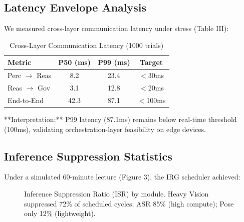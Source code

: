 \documentclass[conference]{IEEEtran}
\begin{document}
\subsection{Latency Envelope Analysis}
We measured cross-layer communication latency under stress (Table III):

\begin{table}[htbp]
\caption{Cross-Layer Communication Latency (1000 trials)}
\begin{center}
\begin{tabular}{lccc}
\toprule
\textbf{Metric} & \textbf{P50 (ms)} & \textbf{P99 (ms)} & \textbf{Target} \\
\midrule
Perc $\to$ Reas & 8.2 & 23.4 & $<$30ms \\
Reas $\to$ Gov & 3.1 & 12.8 & $<$20ms \\
End-to-End & 42.3 & 87.1 & $<$100ms \\
\bottomrule
\end{tabular}
\end{center}
\end{table}

**Interpretation:** P99 latency (87.1ms) remains below real-time threshold (100ms), validating orchestration-layer feasibility on edge devices. 

\subsection{Inference Suppression Statistics}
Under a simulated 60-minute lecture (Figure 3), the IRG scheduler achieved:



\begin{figure}[htbp]
\centering
{}

\caption{Inference Suppression Ratio (ISR) by module. Heavy Vision suppressed 72\% of scheduled cycles; ASR 85\% (high compute); Pose only 12\% (lightweight).}
\label{fig:isr}
\end{figure}
\end{document}
